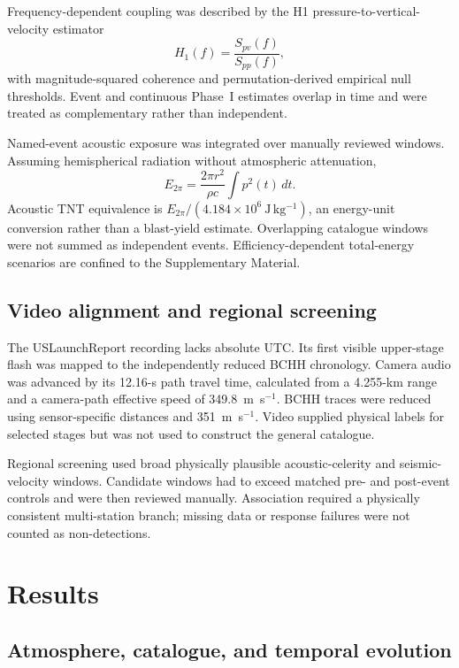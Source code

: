 \documentclass[]{seismica}
\begin{document}
Frequency-dependent coupling was described by the H1 pressure-to-vertical-
velocity estimator
\begin{equation}
 H_1(f)=\frac{S_{pv}(f)}{S_{pp}(f)},
 \label{eq:h1_transfer}
\end{equation}
with magnitude-squared coherence and permutation-derived empirical null
thresholds. Event and continuous Phase~I estimates overlap in time and were
treated as complementary rather than independent.

Named-event acoustic exposure was integrated over manually reviewed windows.
Assuming hemispherical radiation without atmospheric attenuation,
\begin{equation}
 E_{2\pi}=\frac{2\pi r^2}{\rho c}\int p^2(t)\,dt.
 \label{eq:acoustic_energy}
\end{equation}
Acoustic TNT equivalence is $E_{2\pi}/(4.184\times10^6~\mathrm{J\,kg^{-1}})$,
an energy-unit conversion rather than a blast-yield estimate. Overlapping
catalogue windows were not summed as independent events. Efficiency-dependent
total-energy scenarios are confined to the Supplementary Material.

\subsection{Video alignment and regional screening}

The USLaunchReport recording lacks absolute UTC. Its first visible upper-stage
flash was mapped to the independently reduced BCHH chronology. Camera audio
was advanced by its 12.16-s path travel time, calculated from a 4.255-km range
and a camera-path effective speed of 349.8~m~s$^{-1}$. BCHH traces were reduced
using sensor-specific distances and 351~m~s$^{-1}$. Video supplied physical
labels for selected stages but was not used to construct the general catalogue.

Regional screening used broad physically plausible acoustic-celerity and
seismic-velocity windows. Candidate windows had to exceed matched pre- and
post-event controls and were then reviewed manually. Association required a
physically consistent multi-station branch; missing data or response failures
were not counted as non-detections.

\section{Results}
\label{sec:results}

\subsection{Atmosphere, catalogue, and temporal evolution}
\end{document}

